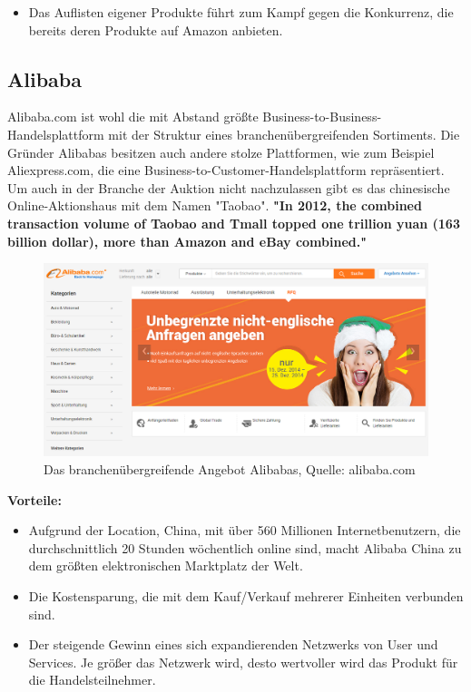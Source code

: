 \documentclass[11pt,a4paper]{article}
\begin{document}
\begin{itemize}
	\item Das Auflisten eigener Produkte führt zum Kampf gegen die Konkurrenz, die bereits deren Produkte auf Amazon anbieten. 
\end{itemize}
\newpage
\subsection{Alibaba}
Alibaba.com ist wohl die mit Abstand größte Business-to-Business-Handelsplattform mit der Struktur eines branchenübergreifenden Sortiments. Die Gründer Alibabas besitzen auch andere stolze Plattformen, wie zum Beispiel Aliexpress.com, die eine Business-to-Customer-Handelsplattform repräsentiert. Um auch in der Branche der Auktion nicht nachzulassen gibt es das chinesische Online-Aktionshaus mit dem Namen "Taobao". \textbf{"In 2012, the combined transaction volume of Taobao and Tmall topped one trillion yuan (163 billion dollar), more than Amazon and eBay combined."}

\begin{figure}[ht!]
	\centering
	\includegraphics[width=180mm]{alibaba}
	\caption{Das branchenübergreifende Angebot Alibabas, Quelle: alibaba.com \label{alibaba}}
\end{figure}

\noindent \textbf{Vorteile:}

\begin{itemize}
	\item Aufgrund der Location, China, mit über 560 Millionen Internetbenutzern, die durchschnittlich 20 Stunden wöchentlich online sind, macht Alibaba China zu dem größten elektronischen Marktplatz der Welt. 
	\item Die Kostensparung, die mit dem Kauf/Verkauf mehrerer Einheiten verbunden sind.
	\item Der steigende Gewinn eines sich expandierenden Netzwerks von User und Services. Je größer das Netzwerk wird, desto wertvoller wird das Produkt für die Handelsteilnehmer.
\end{itemize}
 
\end{document}
